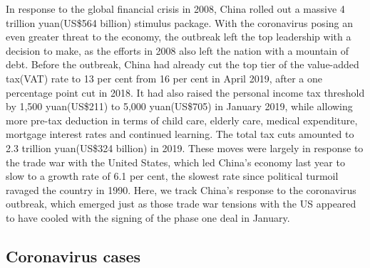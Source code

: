 \documentclass[11pt, a4paper]{article}
\begin{document}
        In response to the global financial crisis in 2008, China rolled out a massive 4 trillion yuan(US\$564 billion) stimulus package.
        \bigbreak
        With the coronavirus posing an even greater threat to the economy, the outbreak left the top leadership with a decision to make, as the efforts in 2008 also left the nation with a mountain of debt.
        \bigbreak
        Before the outbreak, China had already cut the top tier of the value-added tax(VAT) rate to 13 per cent from 16 per cent in April 2019, after a one percentage point cut in 2018. It had also raised the personal income tax threshold by 1,500 yuan(US\$211) to 5,000 yuan(US\$705) in January 2019, while allowing more pre-tax deduction in terms of child care, elderly care, medical expenditure, mortgage interest rates and continued learning. The total tax cuts amounted to 2.3 trillion yuan(US\$324 billion) in 2019.
        \bigbreak
        These moves were largely in response to the trade war with the United States, which led China’s economy last year to slow to a growth rate of 6.1 per cent, the slowest rate since political turmoil ravaged the country in 1990.
        \bigbreak
        Here, we track China’s response to the coronavirus outbreak, which emerged just as those trade war tensions with the US appeared to have cooled with the signing of the phase one deal in January.
        \subsection{Coronavirus cases}
            \begin{table}[H]
                \centering
            \end{table} 

            \vspace{-10mm}
\end{document}
